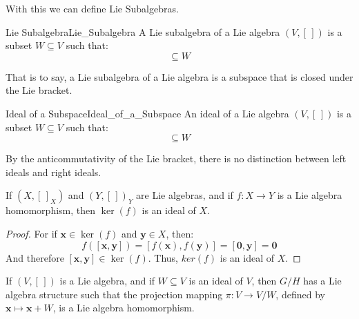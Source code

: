\documentclass[crop=false,class=article]{standalone}                           %
\begin{document}
        With this we can define Lie Subalgebras.
        \begin{fdefinition}{Lie Subalgebra}{Lie_Subalgebra}
            A Lie subalgebra of a Lie algebra $(V,[\,])$ is a subset
            $W\subseteq{V}$ such that:
            \begin{equation}
                [W,W]\subseteq{W}
            \end{equation}
        \end{fdefinition}
        That is to say, a Lie subalgebra of a Lie algebra is a subspace that is
        closed under the Lie bracket.
        \begin{fdefinition}{Ideal of a Subspace}{Ideal_of_a_Subspace}
            An ideal of a Lie algebra $(V,[\,])$ is a subset $W\subseteq{V}$
            such that:
            \begin{equation}
                [V,W]\subseteq{W}
            \end{equation}
        \end{fdefinition}
        By the anticommutativity of the Lie bracket, there is no distinction
        between left ideals and right ideals.
        \begin{theorem}
            If $(X,[\,]_{X})$ and $(Y,[\,])_{Y}$ are Lie algebras, and if
            $f:X\rightarrow{Y}$ is a Lie algebra homomorphism, then
            $\ker(f)$ is an ideal of $X$.
        \end{theorem}
        \begin{proof}
            For if $\mathbf{x}\in\ker(f)$ and $\mathbf{y}\in{X}$, then:
            \begin{equation}
                f([\mathbf{x},\mathbf{y}])
                =[f(\mathbf{x}),f(\mathbf{y})]
                =[\mathbf{0},\mathbf{y}]
                =\mathbf{0}
            \end{equation}
            And therefore $[\mathbf{x},\mathbf{y}]\in\ker(f)$. Thus,
            $ker(f)$ is an ideal of $X$.
        \end{proof}
        \begin{theorem}
            If $(V,[\,])$ is a Lie algebra, and if $W\subseteq{V}$ is an
            ideal of $V$, then $G/H$ has a Lie algebra structure such that the
            projection mapping $\pi:V\rightarrow{V}/W$, defined by
            $\mathbf{x}\mapsto\mathbf{x}+W$, is a Lie algebra homomorphism.
        \end{theorem}
\end{document}
